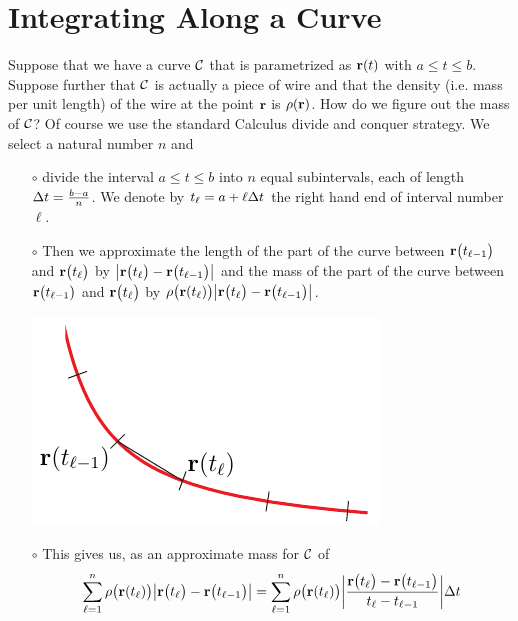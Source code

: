 \section{Integrating Along a Curve}\label{sec:lineIntegral}
Suppose that we have a curve $\mathcal{C}$ that is parametrized as $\mathbf{r}(t)$
with $a\le t\le b$. Suppose further that $\mathcal{C}$ is actually a piece of wire 
and that the density (i.e. mass per unit length) of the wire at the point $\mathbf{r}$ 
is $\rho(\mathbf{r})$. How do we figure out the mass of $\mathcal{C}$? Of course 
we use the standard Calculus divide and conquer strategy. We select a 
natural number $n$ and
\begin{itemize}\itemsep1pt \parskip0pt  %
\item[$\circ$]
divide the interval $a\le t\le b$ into $n$ equal subintervals, 
each of length $\Delta t=\frac{b-a}{n}$. We denote by
$t_\ell = a + \ell\Delta t$ the right hand end of interval number $\ell$.
\item[$\circ$]
Then we approximate the length of the part of the curve between
$\mathbf{r}\big(t_{\ell-1}\big)$ and $\mathbf{r}\big(t_\ell\big)$ by
$\big|\mathbf{r}\big(t_\ell\big)-\mathbf{r}\big(t_{\ell-1}\big)\big|$ and the mass
of the part of the curve between $\mathbf{r}\big(t_{\ell-1}\big)$ 
and $\mathbf{r}\big(t_\ell\big)$ by $\rho\big(\mathbf{r}(t_\ell)\big)
\big|\mathbf{r}\big(t_\ell\big)-\mathbf{r}\big(t_{\ell-1}\big)\big|$.
\begin{nfig}
\begin{center}
    \includegraphics{parCurveL.pdf}
\end{center}
\end{nfig}


\item[$\circ$]
This gives us, as an approximate mass for $\mathcal{C}$ of
\begin{equation*}
\sum_{\ell=1}^n \rho\big(\mathbf{r}(t_\ell)\big)
    \big|\mathbf{r}\big(t_\ell\big)-\mathbf{r}\big(t_{\ell-1}\big)\big|
=\sum_{\ell=1}^n \rho\big(\mathbf{r}(t_\ell)\big)
   \bigg|\frac{\mathbf{r}\big(t_\ell\big)-\mathbf{r}\big(t_{\ell-1}\big)}
                          {t_\ell-t_{\ell-1}}\bigg|\Delta t
\end{equation*}
\end{itemize}
